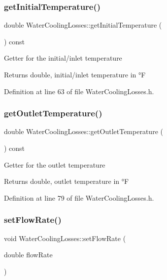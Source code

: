 \subsubsection{\texorpdfstring{get\+Initial\+Temperature()}{getInitialTemperature()}}
{\footnotesize\ttfamily double Water\+Cooling\+Losses\+::get\+Initial\+Temperature (\begin{DoxyParamCaption}{ }\end{DoxyParamCaption}) const\hspace{0.3cm}{\ttfamily [inline]}}

Getter for the initial/inlet temperature \begin{DoxyReturn}{Returns}
double, initial/inlet temperature in °F 
\end{DoxyReturn}


Definition at line 63 of file Water\+Cooling\+Losses.\+h.

\mbox{\label{class_water_cooling_losses_a79fb78755e813b2a3aa36ccd8ccebf7a}} 
\subsubsection{\texorpdfstring{get\+Outlet\+Temperature()}{getOutletTemperature()}}
{\footnotesize\ttfamily double Water\+Cooling\+Losses\+::get\+Outlet\+Temperature (\begin{DoxyParamCaption}{ }\end{DoxyParamCaption}) const\hspace{0.3cm}{\ttfamily [inline]}}

Getter for the outlet temperature \begin{DoxyReturn}{Returns}
double, outlet temperature in °F 
\end{DoxyReturn}


Definition at line 79 of file Water\+Cooling\+Losses.\+h.

\mbox{\label{class_water_cooling_losses_abf4d64d9261818af331613791374d42f}} 
\subsubsection{\texorpdfstring{set\+Flow\+Rate()}{setFlowRate()}}
{\footnotesize\ttfamily void Water\+Cooling\+Losses\+::set\+Flow\+Rate (\begin{DoxyParamCaption}\item[{double}]{flow\+Rate }\end{DoxyParamCaption})\hspace{0.3cm}{\ttfamily [inline]}}

